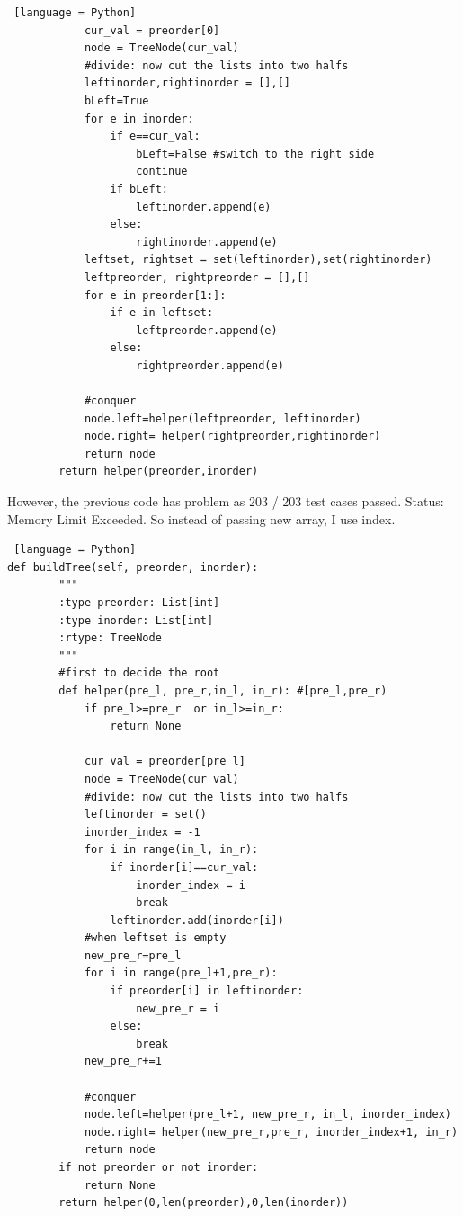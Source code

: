 \documentclass[../main.tex]{subfiles}
\begin{document}
\begin{examples}[resume]
\begin{lstlisting} [language = Python]
            cur_val = preorder[0]
            node = TreeNode(cur_val)
            #divide: now cut the lists into two halfs
            leftinorder,rightinorder = [],[]
            bLeft=True
            for e in inorder:
                if e==cur_val:
                    bLeft=False #switch to the right side
                    continue
                if bLeft:
                    leftinorder.append(e)
                else:
                    rightinorder.append(e)
            leftset, rightset = set(leftinorder),set(rightinorder)
            leftpreorder, rightpreorder = [],[]
            for e in preorder[1:]:
                if e in leftset:
                    leftpreorder.append(e)
                else:
                    rightpreorder.append(e)
                
            #conquer 
            node.left=helper(leftpreorder, leftinorder)
            node.right= helper(rightpreorder,rightinorder)
            return node
        return helper(preorder,inorder)
\end{lstlisting}
However, the previous code has problem as 203 / 203 test cases passed.
Status: Memory Limit Exceeded. So instead of passing new array, I use index.
\begin{lstlisting} [language = Python]
def buildTree(self, preorder, inorder):
        """
        :type preorder: List[int]
        :type inorder: List[int]
        :rtype: TreeNode
        """
        #first to decide the root
        def helper(pre_l, pre_r,in_l, in_r): #[pre_l,pre_r)
            if pre_l>=pre_r  or in_l>=in_r:
                return None
            
            cur_val = preorder[pre_l]
            node = TreeNode(cur_val)
            #divide: now cut the lists into two halfs
            leftinorder = set()
            inorder_index = -1
            for i in range(in_l, in_r):
                if inorder[i]==cur_val:
                    inorder_index = i
                    break
                leftinorder.add(inorder[i])
            #when leftset is empty         
            new_pre_r=pre_l
            for i in range(pre_l+1,pre_r):
                if preorder[i] in leftinorder:
                    new_pre_r = i
                else:
                    break
            new_pre_r+=1         
                
            #conquer 
            node.left=helper(pre_l+1, new_pre_r, in_l, inorder_index)
            node.right= helper(new_pre_r,pre_r, inorder_index+1, in_r)
            return node
        if not preorder or not inorder:
            return None
        return helper(0,len(preorder),0,len(inorder))
\end{lstlisting}


\end{examples}
\end{document}
